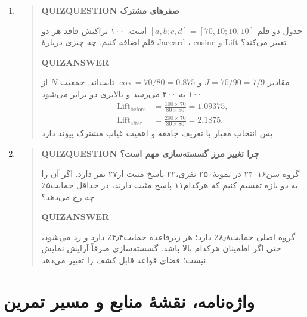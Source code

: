 \begin{enumerate}
\item\begin{quote}\textbf{QUIZQUESTION صفرهای مشترک}\par 
جدول دو قلم $[a,b;c,d]=[70,10;10,10]$ است. ۱۰۰ تراکنش فاقد هر دو قلم اضافه کنیم. چه چیزی دربارهٔ Jaccard ، cosine و Lift تغییر می‌کند؟
\par\textbf{QUIZANSWER}\par مقادیر $J=70/90=7/9$ و $\operatorname{cos}=70/80=0.875$ ثابت‌اند. جمعیت $N$ از ۱۰۰ به ۲۰۰ می‌رسد و بالابری دو برابر می‌شود:
\begin{align*}
\operatorname{Lift}_{\mathrm{before}}&=\frac{100\times70}{80\times80}=1.09375,\\
\operatorname{Lift}_{\mathrm{after}}&=\frac{200\times70}{80\times80}=2.1875.
\end{align*}
پس انتخاب معیار با تعریف جامعه و اهمیت غیاب مشترک پیوند دارد.\par 
\end{quote}

\item\begin{quote}\textbf{QUIZQUESTION چرا تغییر مرز گسسته‌سازی مهم است؟}\par 
گروه سن۱۶--۲۴ در نمونهٔ۲۵۰ نفری،۲۲ پاسخ مثبت از۲۷ نفر دارد. اگر آن را به دو بازه تقسیم کنیم که هرکدام۱۱ پاسخ مثبت دارند، در حداقل حمایت۵٪ چه رخ می‌دهد؟
\par\textbf{QUIZANSWER}\par گروه اصلی حمایت۸٫۸٪ دارد؛ هر زیرقاعده حمایت۴٫۴٪ دارد و رد می‌شود، حتی اگر اطمینان هرکدام بالا باشد. گسسته‌سازی صرفاً آرایش نمایش نیست؛ فضای قواعد قابل کشف را تغییر می‌دهد.\par 
\end{quote}
\end{enumerate}


\chapter{واژه‌نامه، نقشهٔ منابع و مسیر تمرین}
